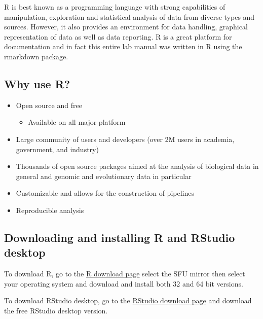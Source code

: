 \documentclass[
]{book}
\providecommand{\tightlist}{%
  \setlength{\itemsep}{0pt}\setlength{\parskip}{0pt}}
\theoremstyle{definition}
\theoremstyle{definition}
\theoremstyle{definition}
\theoremstyle{definition}
\theoremstyle{remark}
\begin{document}
R is best known as a programming language with strong capabilities of
manipulation, exploration and statistical analysis of data from diverse
types and sources. However, it also provides an environment for data
handling, graphical representation of data as well as data reporting.
R is a great platform for documentation and in fact this entire lab
manual was written in R using the rmarkdown package.

\hypertarget{why-use-r}{%
\subsection*{\texorpdfstring{\textbf{Why use R?}}{Why use R?}}\label{why-use-r}}

\begin{itemize}
\tightlist
\item
  Open source and free

  \begin{itemize}
  \tightlist
  \item
    Available on all major platform
  \end{itemize}
\item
  Large community of users and developers (over 2M users in academia, government, and industry)
\item
  Thousands of open source packages aimed at the analysis of biological data in general and genomic and evolutionary data in particular
\item
  Customizable and allows for the construction of pipelines
\item
  Reproducible analysis
\end{itemize}

\hypertarget{downloading-and-installing-r-and-rstudio-desktop}{%
\subsection*{\texorpdfstring{\textbf{Downloading and installing R and RStudio desktop}}{Downloading and installing R and RStudio desktop}}\label{downloading-and-installing-r-and-rstudio-desktop}}

To download R, go to the \href{https://cran.r-project.org/mirrors.html}{R download page} select the SFU mirror then select your operating system and download and install both 32 and 64 bit versions.

To download RStudio desktop, go to the \href{https://posit.co/download/rstudio-desktop/}{RStudio download page} and download the free RStudio desktop version.
\end{document}
